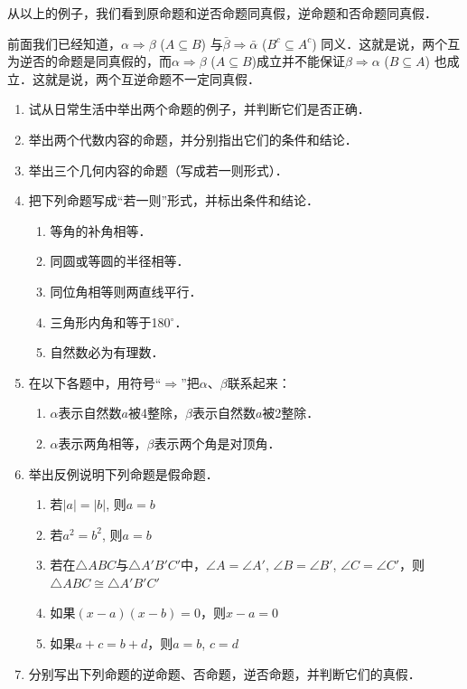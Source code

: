 从以上的例子，我们看到原命题和逆否命题同真假，逆命题和否命题同真假．

前面我们已经知道，$\alpha\Rightarrow \beta$ ($A\subseteq B$) 与$\bar\beta\Rightarrow\bar\alpha$ ($B^c\subseteq A^c$)
同义．这就是说，两个互为逆否的命题是同真假的，而$\alpha\Rightarrow\beta$ ($A\subseteq B$)成立并不能保证$\beta\Rightarrow \alpha$ ($B\subseteq A$)
也成立．这就是说，两个互逆命题不一定同真假．

\begin{ex}
	\begin{enumerate}
		\item 试从日常生活中举出两个命题的例子，并判断它们是否正确．
		\item 举出两个代数内容的命题，并分别指出它们的条件和结论．
		\item 举出三个几何内容的命题（写成若一则形式）．
		\item 把下列命题写成“若一则”形式，并标出条件和结论．
		\begin{enumerate}
			\item 等角的补角相等．
			\item 同圆或等圆的半径相等．
			\item 同位角相等则两直线平行．
			\item 三角形内角和等于180$^{\circ}$．
			\item 自然数必为有理数．
		\end{enumerate}
		\item 在以下各题中，用符号“$\Rightarrow$”把$\alpha$、$\beta$联系起来：
		\begin{enumerate}
			\item $\alpha$表示自然数$a$被4整除，$\beta$表示自然数$a$被2整除．
			\item $\alpha$表示两角相等，$\beta$表示两个角是对顶角．
		\end{enumerate}
		\item 举出反例说明下列命题是假命题．
		\begin{enumerate}
			\item 若$|a|=|b|$, 则$a=b$
			\item 若$a^2=b^2$, 则$a=b$
			\item 若在$\triangle ABC$与$\triangle A'B'C'$中，$\angle A=\angle A'$, $\angle B=\angle B'$, $\angle C=\angle C'$，则$\triangle ABC\cong \triangle A'B'C'$
			\item 如果$(x-a)(x-b)=0$，则$x-a=0$
			\item 如果$a+c=b+d$，则$a=b$, $c=d$
		\end{enumerate}
		\item 分别写出下列命题的逆命题、否命题，逆否命题，并判断它们的真假．

\end{enumerate}
\end{ex}
